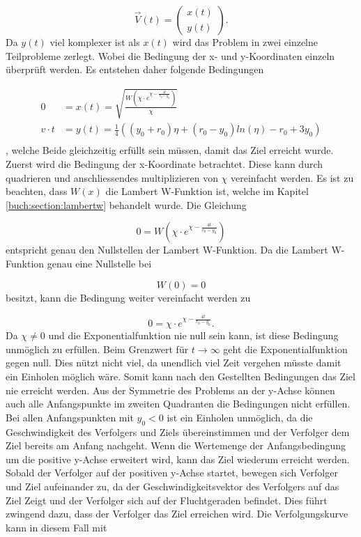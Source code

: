 \begin{equation}
    \vec{V}(t)
    =
    \left( \begin{array}{c} x(t) \\ y(t) \end{array} \right)
    \text{.}
\end{equation}
%
 Da $y(t)$ viel komplexer ist als $x(t)$ wird das Problem in zwei einzelne Teilprobleme zerlegt. Wobei die Bedingung der x- und y-Koordinaten einzeln überprüft werden. Es entstehen daher folgende Bedingungen

\begin{align*}
    0
    &=
    x(t)
    =
    \sqrt{\frac{W\left(\chi\cdot e^{\chi-\frac{4t}{r_0-y_0}}\right)}{\chi}}
    \\
    v \cdot t
    &=
    y(t)
    =
    \frac{1}{4}\left(\left(y_0+r_0\right)\eta+\left(r_0-y_0\right)ln\left(\eta\right)-r_0+3y_0\right)
    \\
\end{align*}
%
, welche Beide gleichzeitig erfüllt sein müssen, damit das Ziel erreicht wurde.
Zuerst wird die Bedingung der x-Koordinate betrachtet.
Diese kann durch quadrieren und anschliessendes multiplizieren von $\chi$ vereinfacht werden.
Es ist zu beachten, dass $W(x)$ die Lambert W-Funktion ist, welche im Kapitel \eqref{buch:section:lambertw} behandelt wurde.
Die Gleichung

\begin{equation}
    0
    =
    W\left(\chi\cdot e^{\chi-\frac{4t}{r_0-y_0}}\right)
\end{equation}
%
entspricht genau den Nullstellen der Lambert W-Funktion. Da die Lambert W-Funktion genau eine Nullstelle bei

\begin{equation*}
    W(0)=0
\end{equation*}
%
besitzt, kann die Bedingung weiter vereinfacht werden zu

\begin{equation}
    0
    =
    \chi\cdot e^{\chi-\frac{4t}{r_0-y_0}}
    \text{.}
\end{equation}
%
Da $\chi\neq0$ und die Exponentialfunktion nie null sein kann, ist diese Bedingung unmöglich zu erfüllen.
Beim Grenzwert für $t\rightarrow\infty$ geht die Exponentialfunktion gegen null.
Dies nützt nicht viel, da unendlich viel Zeit vergehen müsste damit ein Einholen möglich wäre.
Somit kann nach den Gestellten Bedingungen das Ziel nie erreicht werden.
Aus der Symmetrie des Problems an der y-Achse können auch alle Anfangspunkte im zweiten Quadranten die Bedingungen nicht erfüllen.
Bei allen Anfangspunkten mit $y_0<0$ ist ein Einholen unmöglich, da die Geschwindigkeit des Verfolgers und Ziels übereinstimmen und der Verfolger dem Ziel bereits am Anfang nachgeht.
Wenn die Wertemenge der Anfangsbedingung um die positive y-Achse erweitert wird, kann das Ziel wiederum erreicht werden.
Sobald der Verfolger auf der positiven y-Achse startet, bewegen sich Verfolger und Ziel aufeinander zu, da der Geschwindigkeitsvektor des Verfolgers auf das Ziel Zeigt und der Verfolger sich auf der Fluchtgeraden befindet.
Dies führt zwingend dazu, dass der Verfolger das Ziel erreichen wird.
Die Verfolgungskurve kann in diesem Fall mit

